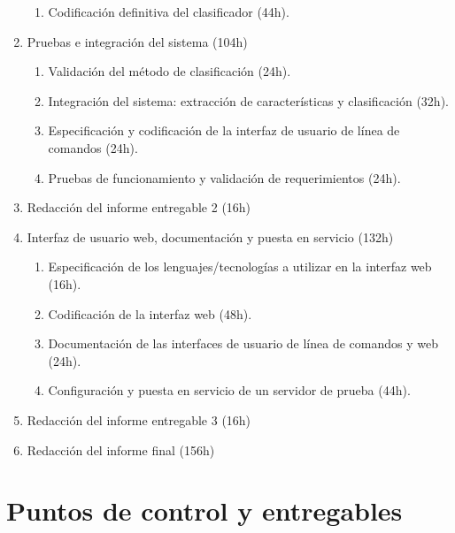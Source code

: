 \documentclass[12pt,bibliography=oldstyle,DIV=12,parskip=full-,titlepage]{scrartcl}
\begin{document}
\begin{enumerate}
\begin{enumerate}
  \item Codificación definitiva del clasificador (44h).
  \end{enumerate}
\newpage
\item Pruebas e integración del sistema (104h)
  \begin{enumerate}
  \item Validación del método de clasificación (24h).
  \item Integración del sistema: extracción de características y
    clasificación (32h).
  \item Especificación y codificación de la interfaz de usuario de
    línea de comandos (24h).
  \item Pruebas de funcionamiento y validación de requerimientos (24h).
  \end{enumerate}
\item Redacción del informe entregable 2 (16h)
\item Interfaz de usuario web, documentación y puesta en servicio (132h)
  \begin{enumerate}
  \item Especificación de los lenguajes/tecnologías a utilizar en la
    interfaz web (16h).
  \item Codificación de la interfaz web (48h).
  \item Documentación de las interfaces de usuario de línea de
    comandos y web (24h).
  \item Configuración y puesta en servicio de un servidor de prueba
    (44h).
  \end{enumerate}
\item Redacción del informe entregable 3 (16h)
\item Redacción del informe final (156h)
\end{enumerate}
%
%
\section{Puntos de control y entregables}
\end{document}
